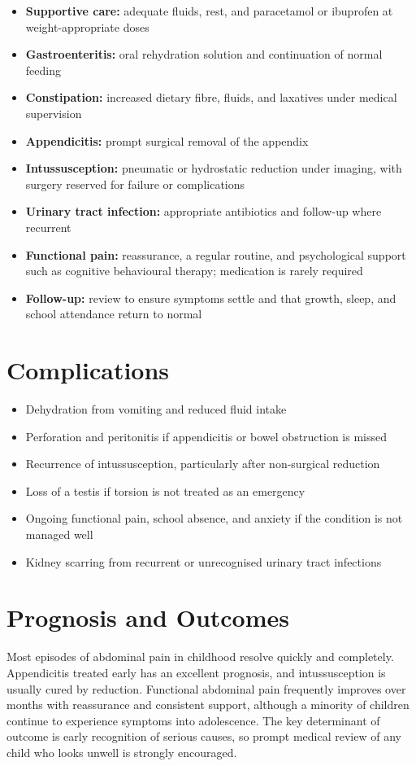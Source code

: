 \begin{itemize}
    \item \textbf{Supportive care:} adequate fluids, rest, and paracetamol or ibuprofen at weight-appropriate doses
    \item \textbf{Gastroenteritis:} oral rehydration solution and continuation of normal feeding
    \item \textbf{Constipation:} increased dietary fibre, fluids, and laxatives under medical supervision
    \item \textbf{Appendicitis:} prompt surgical removal of the appendix
    \item \textbf{Intussusception:} pneumatic or hydrostatic reduction under imaging, with surgery reserved for failure or complications
    \item \textbf{Urinary tract infection:} appropriate antibiotics and follow-up where recurrent
    \item \textbf{Functional pain:} reassurance, a regular routine, and psychological support such as cognitive behavioural therapy; medication is rarely required
    \item \textbf{Follow-up:} review to ensure symptoms settle and that growth, sleep, and school attendance return to normal
\end{itemize}

\section*{Complications}
\begin{itemize}
    \item Dehydration from vomiting and reduced fluid intake
    \item Perforation and peritonitis if appendicitis or bowel obstruction is missed
    \item Recurrence of intussusception, particularly after non-surgical reduction
    \item Loss of a testis if torsion is not treated as an emergency
    \item Ongoing functional pain, school absence, and anxiety if the condition is not managed well
    \item Kidney scarring from recurrent or unrecognised urinary tract infections
\end{itemize}

\section*{Prognosis and Outcomes}
Most episodes of abdominal pain in childhood resolve quickly and completely. Appendicitis treated early has an excellent prognosis, and intussusception is usually cured by reduction. Functional abdominal pain frequently improves over months with reassurance and consistent support, although a minority of children continue to experience symptoms into adolescence. The key determinant of outcome is early recognition of serious causes, so prompt medical review of any child who looks unwell is strongly encouraged.

